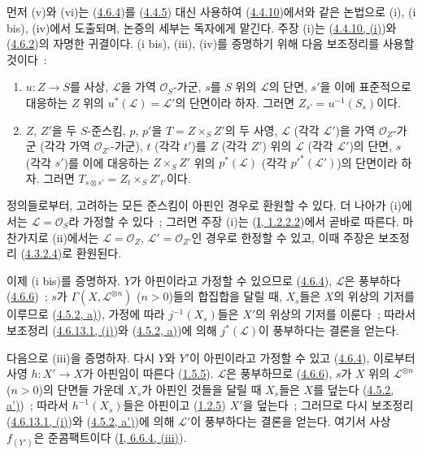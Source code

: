 먼저 (v)와 (vi)는
(\hyperref[II.4.6.4-ko]{4.6.4})를
(\hyperref[II.4.4.5-ko]{4.4.5}) 대신 사용하여
(\hyperref[II.4.4.10-ko]{4.4.10})에서와 같은 논법으로 (i), (i bis),
(iv)에서 도출되며, 논증의 세부는 독자에게 맡긴다. 주장 (i)는
(\hyperref[II.4.4.10-ko]{4.4.10, (i)})와
(\hyperref[II.4.6.2-ko]{4.6.2})의 자명한 귀결이다. (i bis), (iii),
(iv)를 증명하기 위해 다음 보조정리를 사용할 것이다~:

\begin{lemma}[4.6.13.1]
\label{II.4.6.13.1-ko}
\begin{enumerate}
  \item[\rm{(i)}] $u:Z\to S$를 사상, $\mathcal{L}$을 가역
  $\mathcal{O}_S$-가군, $s$를 $S$ 위의 $\mathcal{L}$의 단면,
  $s'$을 이에 표준적으로 대응하는 $Z$ 위의
  $u^*(\mathcal{L})=\mathcal{L}'$의 단면이라 하자. 그러면
  $Z_{s'}=u^{-1}(S_s)$이다.
  \item[\rm{(ii)}] $Z$, $Z'$을 두 $S$-준스킴, $p$, $p'$을
  $T=Z\times_S Z'$의 두 사영, $\mathcal{L}$ (각각
  $\mathcal{L}'$)을 가역 $\mathcal{O}_Z$-가군 (각각 가역
  $\mathcal{O}_{Z'}$-가군), $t$ (각각 $t'$)를 $Z$ (각각 $Z'$)
  위의 $\mathcal{L}$ (각각 $\mathcal{L}'$)의 단면, $s$ (각각
  $s'$)를 이에 대응하는 $Z\times_S Z'$ 위의 $p^*(\mathcal{L})$
  (각각 $p'^*(\mathcal{L}')$)의 단면이라 하자. 그러면
  $T_{s\otimes s'}=Z_t\times_S Z'_{t'}$이다.
\end{enumerate}
\end{lemma}

정의들로부터, 고려하는 모든 준스킴이 아핀인 경우로 환원할 수 있다.
더 나아가 (i)에서는 $\mathcal{L}=\mathcal{O}_S$라 가정할 수 있다~;
그러면 주장 (i)는 (\hyperref[I.1.2.2.2-ko]{I, 1.2.2.2})에서 곧바로
따른다. 마찬가지로 (ii)에서는
$\mathcal{L}=\mathcal{O}_Z$, $\mathcal{L}'=\mathcal{O}_{Z'}$인
경우로 한정할 수 있고, 이때 주장은 보조정리
(\hyperref[II.4.3.2.4-ko]{4.3.2.4})로 환원된다.

이제 (i bis)를 증명하자. $Y$가 아핀이라고 가정할 수 있으므로
(\hyperref[II.4.6.4-ko]{4.6.4}), $\mathcal{L}$은 풍부하다
(\hyperref[II.4.6.6-ko]{4.6.6})~; $s$가
$\Gamma(X,\mathcal{L}^{\otimes n})$ ($n>0$)들의 합집합을 달릴 때,
$X_s$들은 $X$의 위상의 기저를 이루므로
(\hyperref[II.4.5.2-ko]{4.5.2, a)}), 가정에 따라
$j^{-1}(X_s)$들은 $X'$의 위상의 기저를 이룬다~; 따라서 보조정리
(\hyperref[II.4.6.13.1-ko]{4.6.13.1, (i)})와
(\hyperref[II.4.5.2-ko]{4.5.2, a)})에 의해
$j^*(\mathcal{L})$이 풍부하다는 결론을 얻는다.

다음으로 (iii)을 증명하자. 다시 $Y$와 $Y'$이 아핀이라고 가정할 수
있고 (\hyperref[II.4.6.4-ko]{4.6.4}), 이로부터 사영
$h:X'\to X$가 아핀임이 따른다
(\hyperref[II.1.5.5-ko]{1.5.5}). $\mathcal{L}$은 풍부하므로
(\hyperref[II.4.6.6-ko]{4.6.6}), $s$가 $X$ 위의
$\mathcal{L}^{\otimes n}$ ($n>0$)의 단면들 가운데 $X_s$가 아핀인
것들을 달릴 때 $X_s$들은 $X$를 덮는다
(\hyperref[II.4.5.2-ko]{4.5.2, a')})~; 따라서 $h^{-1}(X_s)$들은
아핀이고 (\hyperref[II.1.2.5-ko]{1.2.5}) $X'$을 덮는다~; 그러므로
다시 보조정리 (\hyperref[II.4.6.13.1-ko]{4.6.13.1, (i)})와
(\hyperref[II.4.5.2-ko]{4.5.2, a')})에 의해 $\mathcal{L}'$이
풍부하다는 결론을 얻는다. 여기서 사상 $f_{(Y')}$은 준콤팩트이다
(\hyperref[I.6.6.4-ko]{I, 6.6.4, (iii)}).

